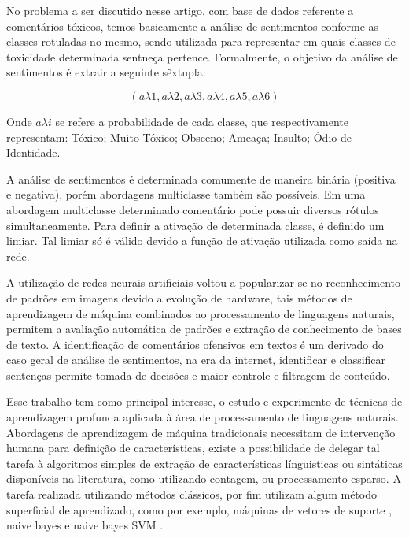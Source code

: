 \documentclass[12pt]{article}
\begin{document}
No problema a ser discutido nesse artigo, com base de dados referente a comentários tóxicos, temos basicamente a análise de sentimentos conforme as classes rotuladas no mesmo, sendo utilizada para representar em quais classes de toxicidade determinada sentneça pertence. Formalmente, o objetivo da análise de sentimentos é extrair a seguinte sêxtupla:

\[
(a\lambda1, a\lambda2, a\lambda3, a\lambda4, a\lambda5, a\lambda6)
\]

Onde $a \lambda i$ se refere a probabilidade de cada classe, que respectivamente representam: Tóxico; Muito Tóxico; Obsceno; Ameaça; Insulto; Ódio de Identidade.

A análise de sentimentos é determinada comumente de maneira binária (positiva e negativa), porém abordagens multiclasse também são possíveis. Em uma abordagem multiclasse determinado comentário pode possuir diversos rótulos simultaneamente. Para definir a ativação de determinada classe, é definido um limiar. Tal limiar só é válido devido a função de ativação utilizada como saída na rede.

A utilização de redes neurais artificiais voltou a popularizar-se no reconhecimento de padrões em imagens devido a evolução de hardware, tais métodos de aprendizagem de máquina combinados ao processamento de linguagens naturais, permitem a avaliação automática de padrões e extração de conhecimento de bases de texto. A identificação de comentários ofensivos em textos é um derivado do caso geral de análise de sentimentos, na era da internet, identificar e classificar sentenças permite tomada de decisões e maior controle e filtragem de conteúdo. 

Esse trabalho tem como principal interesse, o estudo e experimento de técnicas de aprendizagem profunda aplicada à área de processamento de linguagens naturais. Abordagens de aprendizagem de máquina tradicionais necessitam de intervenção humana para definição de características, existe a possibilidade de delegar tal tarefa à algoritmos simples de extração de características línguisticas ou sintáticas disponíveis na literatura, como utilizando contagem, ou processamento esparso. A tarefa realizada utilizando métodos clássicos, por fim utilizam algum método superficial de aprendizado, como por exemplo, máquinas de vetores de suporte \cite{DBLP:journals/ml/CortesV95}, naive bayes e naive bayes SVM \cite{wang:2012}.
\end{document}
